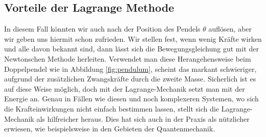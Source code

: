 \subsection{Vorteile der Lagrange Methode}
In diesem Fall könnten wir auch nach der Position des Pendels \(\theta\) auflösen,
aber wir geben uns hiermit schon zufrieden.
Wir stellen fest, wenn wenig Kräfte wirken und alle davon bekannt sind,
dann lässt sich die Bewegungsgleichung gut mit der Newtonschen Methode herleiten.
Verwendet man diese Herangehensweise beim Doppelpendel wie in Abbildung \ref{fig:pendulum},
scheint das markant schwieriger, aufgrund der zusätzlichen Zwangskräfte durch die zweite Masse.
Sicherlich ist es auf diese Weise möglich, doch mit der Lagrange-Mechanik setzt man mit der Energie an.
Genau in Fällen wie diesen und noch komplexeren Systemen, wo sich die Krafteinwirkungen nicht einfach
bestimmen lassen, stellt sich die Lagrange-Mechanik als hilfreicher heraus.
Dies hat sich auch in der Praxis als nützlicher erwiesen, wie beispielsweise 
in den Gebieten der Quantenmechanik.%
